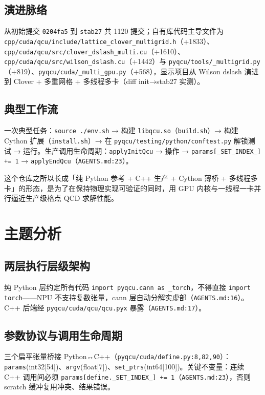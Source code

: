 \documentclass[UTF8]{ctexart}
\begin{document}
\subsection{演进脉络}
从初始提交 \texttt{0204fa5} 到 \texttt{stab27} 共 1120 提交；自有库代码主导文件为 \nolinkurl{cpp/cuda/qcu/include/lattice_clover_multigrid.h}（+1833）、\nolinkurl{cpp/cuda/qcu/src/clover_dslash_multi.cu}（+1610）、\nolinkurl{cpp/cuda/qcu/src/wilson_dslash.cu}（+1442）与 \nolinkurl{pyqcu/tools/_multigrid.py}（+819）、\nolinkurl{pyqcu/cuda/_multi_gpu.py}（+568），显示项目从 Wilson dslash 演进到 Clover + 多重网格 + 多线程多卡（diff init→stab27 实测）。

\subsection{典型工作流}
一次典型任务：\texttt{source ./env.sh} → 构建 \texttt{libqcu.so}（\texttt{build.sh}）→ 构建 Cython 扩展（\texttt{install.sh}）→ 在 \texttt{pyqcu/testing/python/conftest.py} 解锁测试 → 运行。生产调用生命周期：\texttt{applyInitQcu} → 操作 → \texttt{params[\_SET\_INDEX\_] += 1} → \texttt{applyEndQcu}（\texttt{AGENTS.md:23}）。

\begin{ideabox}
这个仓库之所以长成「纯 Python 参考 + C++ 生产 + Cython 薄桥 + 多线程多卡」的形态，是为了在保持物理实现可验证的同时，用 GPU 内核与一线程一卡并行逼近生产级格点 QCD 求解性能。
\end{ideabox}

\section{主题分析}

\subsection{两层执行层级架构}
纯 Python 层约定所有代码 \texttt{import pyqcu.cann as \_torch}，不得直接 \texttt{import torch}——NPU 不支持复数张量，cann 层自动分解实虚部（\texttt{AGENTS.md:16}）。C++ 后端经 \texttt{pyqcu/cuda/qcu/qcu.pyx} 暴露（\texttt{AGENTS.md:17}）。

\subsection{参数协议与调用生命周期}
三个扁平张量桥接 Python↔C++（\texttt{pyqcu/cuda/define.py:8,82,90}）：\texttt{params}(int32[54])、\texttt{argv}(float[7])、\texttt{set\_ptrs}(int64[100])。关键不变量：连续 C++ 调用间必须 \nolinkurl{params[define._SET_INDEX_] += 1}（\texttt{AGENTS.md:23}），否则 scratch 缓冲复用冲突、结果错误。
\end{document}
